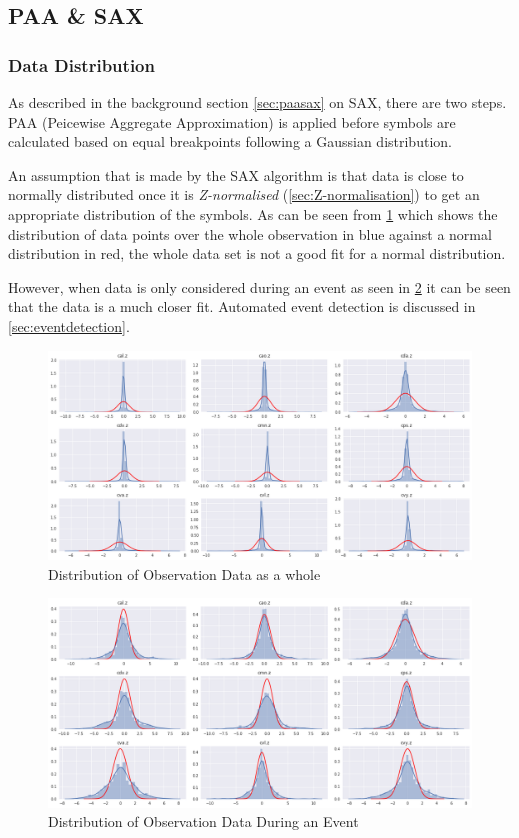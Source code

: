 \documentclass[../report.tex]{subfiles}
\begin{document}
	
\subsection{PAA \& SAX}
	
\subsubsection{Data Distribution} \label{sec:distribution}

	As described in the background section \cref{sec:paasax} on SAX, there are two steps.  PAA (Peicewise Aggregate Approximation) is applied before symbols are calculated based on equal breakpoints following a Gaussian distribution.
	
	An assumption that is made by the SAX algorithm is that data is close to normally distributed  once it is \textit{Z-normalised} (\cref{sec:Z-normalisation}) to get an appropriate distribution of the symbols.  As can be seen from \cref{fig:dist_obs} which shows the distribution of data points over the whole observation in blue against a normal distribution in red, the whole data set is not a good fit for a normal distribution.

	However, when data is only considered during an event as seen in \cref{fig:dist_evt} it can be seen that the data is a much closer fit.  Automated event detection is discussed in \cref{sec:eventdetection}.
	
\begin{figure}[H]
	\centering
	\includegraphics[width=0.8\linewidth]{img/distribution_obs}
	\caption{Distribution of Observation Data as a whole}
	\label{fig:dist_obs}
\end{figure}

\begin{figure}[H]
	\centering
	\includegraphics[width=0.8\linewidth]{img/distribution_evt}
	\caption{Distribution of Observation Data During an Event}
	\label{fig:dist_evt}
\end{figure}
\end{document}

